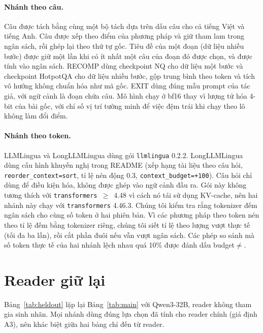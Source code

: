 \documentclass[11pt]{article}
\begin{document}
\paragraph{Nhánh theo câu.} Câu được tách bằng cùng một bộ tách dựa trên dấu câu cho cả tiếng Việt
và tiếng Anh. Câu được xếp theo điểm của phương pháp và giữ tham lam trong ngân sách, rồi ghép lại
theo thứ tự gốc. Tiêu đề của một đoạn (dữ liệu nhiều bước) được giữ một lần khi có ít nhất một câu
của đoạn đó được chọn, và được tính vào ngân sách. RECOMP dùng checkpoint NQ cho dữ liệu một bước
và checkpoint HotpotQA cho dữ liệu nhiều bước, gộp trung bình theo token và tích vô hướng không
chuẩn hóa như mã gốc. EXIT dùng đúng mẫu prompt của tác giả, với ngữ cảnh là đoạn chứa câu. Mô hình
chạy ở bf16 thay vì lượng tử hóa 4-bit của bài gốc, với chỉ số vị trí tường minh để việc đệm trái
khi chạy theo lô không làm đổi điểm.

\paragraph{Nhánh theo token.} LLMLingua và LongLLMLingua dùng gói \texttt{llmlingua} 0.2.2. LongLLMLingua
dùng cấu hình khuyến nghị trong README (xếp hạng tài liệu theo câu hỏi, \texttt{reorder\_context=sort},
tỉ lệ nén động 0.3, \texttt{context\_budget=+100}). Câu hỏi chỉ dùng để điều kiện hóa, không được
ghép vào ngữ cảnh đầu ra. Gói này không tương thích với \texttt{transformers}~$\geq$~4.48 vì cách
nó tái sử dụng KV-cache, nên hai nhánh này chạy với \texttt{transformers} 4.46.3. Chúng tôi kiểm
tra rằng tokenizer đếm ngân sách cho cùng số token ở hai phiên bản. Vì các phương pháp theo token nén theo tỉ lệ đếm
bằng tokenizer riêng, chúng tôi siết tỉ lệ theo lượng vượt thực tế (tối đa ba lần), rồi cắt phần đuôi
nếu vẫn vượt ngân sách. Các phép so sánh mà số token thực tế của hai nhánh lệch nhau quá 10\% được
đánh dấu budget${\neq}$.

\section{Reader giữ lại}
\label{app:heldout}
Bảng~\ref{tab:heldout} lặp lại Bảng~\ref{tab:main} với Qwen3-32B, reader không tham gia sinh nhãn. Mọi nhánh
dùng đúng lựa chọn đã tính cho reader chính (giả định A3), nên khác biệt giữa hai bảng chỉ đến từ reader.
\end{document}

